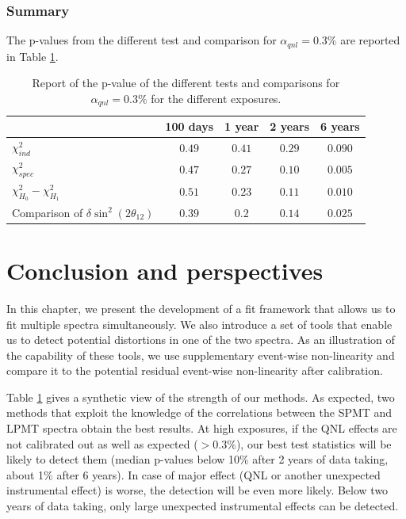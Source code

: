 \documentclass[../main.tex]{subfiles}
\begin{document}
\subsubsection{Summary}

The p-values from the different test and comparison for $\alpha_{qnl} = 0.3\%$ are reported in Table \ref{tab:joint_fit:results:p_value}.
\begin{table}[ht]
  \centering
  \begin{tabular}{l | c | c | c | c}
                                   & 100 days          & 1 year           & 2 years          & 6 years \\
                                   \hline
    $\chi^2_{ind}$                               & $0.49$  & $0.41 $ & $0.29$ & $0.090$ \\
    $\chi^2_{spec}$                              & $0.47$  & $0.27 $ & $\bm{0.10}$ & $\bm{0.005}$ \\
    $\chi^2_{H_0} - \chi^2_{H_1}$                & $0.51$  & $0.23 $ & $\bm{0.11}$ & $\bm{0.010}$ \\
    Comparison of $\delta \sin^2(2 \theta_{12})$ & $0.39$  & $0.2  $ & $0.14$ & $0.025$ \\
  \end{tabular}
  \caption{Report of the p-value of the different tests and comparisons for $\alpha_{qnl} = 0.3\%$ for the different exposures.}
  \label{tab:joint_fit:results:p_value}
\end{table}


%
%
%
%
%

\section{Conclusion and perspectives}
\label{sec:joint_fit:conclusion}

In this chapter, we present the development of a fit framework that allows us to fit multiple spectra simultaneously. We also introduce a set of tools that enable us to detect potential distortions in one of the two spectra. As an illustration of the capability of these tools, we use supplementary event-wise non-linearity and compare it to the potential residual event-wise non-linearity after calibration.

Table \ref{tab:joint_fit:results:p_value} gives a synthetic view of the strength of our methods. As expected, two methods that exploit the knowledge of the correlations between the SPMT and LPMT spectra obtain the best results. At high exposures, if the QNL effects are not calibrated out as well as expected ($>0.3\%$), our best test statistics will be likely to detect them (median p-values below 10\% after 2 years of data taking,  about 1\% after 6 years).
In case of major effect (QNL or another unexpected instrumental effect) is worse, the detection will be even more likely.  Below two years of data taking, only large unexpected instrumental effects can be detected.
\end{document}
